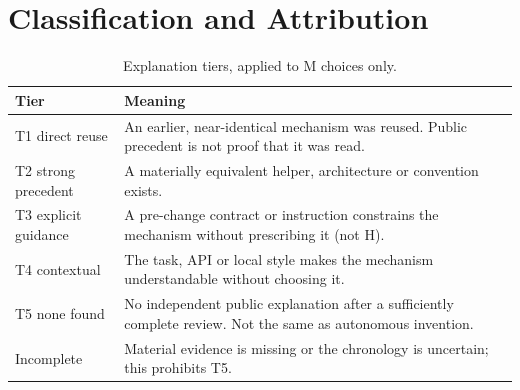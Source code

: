\FloatBarrier
\section{Classification and Attribution}\label{sec:s2}


\begin{table}[H]
\caption{Explanation tiers, applied to M choices only.}
\label{tab:rules-full}
\footnotesize\renewcommand{\arraystretch}{1.12}
\begin{tabularx}{\linewidth}{@{}L{3.3cm}Y@{}}
\toprule
\textbf{Tier} & \textbf{Meaning}\\
\midrule
T1 direct reuse & An earlier, near-identical mechanism was reused. Public precedent is not proof that it was read.\\
T2 strong precedent & A materially equivalent helper, architecture or convention exists.\\
T3 explicit guidance & A pre-change contract or instruction constrains the mechanism without prescribing it (not H).\\
T4 contextual & The task, API or local style makes the mechanism understandable without choosing it.\\
T5 none found & No independent public explanation after a sufficiently complete review. Not the same as autonomous invention.\\
Incomplete & Material evidence is missing or the chronology is uncertain; this prohibits T5.\\
\bottomrule
\end{tabularx}
\end{table}

